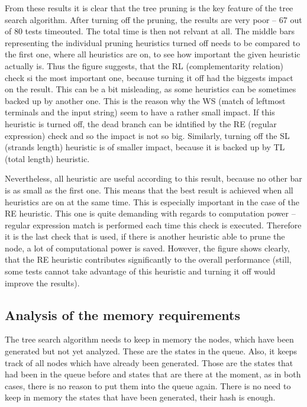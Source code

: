 From these results it is clear that the tree pruning is the key feature of the tree search algorithm. After turning off the pruning, the results are very poor -- 67 out of 80 tests timeouted. The total time is then not relvant at all. The middle bars representing the individual pruning heuristics turned off needs to be compared to the first one, where all heuristics are on, to see how important the given heuristic actually is. Thus the figure suggests, that the RL (complementarity relation) check si the most important one, because turning it off had the biggests impact on the result. This can be a bit misleading, as some heuristics can be sometimes backed up by another one. This is the reason why the WS (match of leftmost terminals and the input string) seem to have a rather small impact. If this heuristic is turned off, the dead branch can be idntified by the RE (regular expression) check and so the impact is not so big. Similarly, turning off the SL (strands length) heuristic is of smaller impact, because it is backed up by TL (total length) heuristic.

Nevertheless, all heuristic are useful according to this result, because no other bar is as small as the first one. This means that the best result is achieved when all heuristics are on at the same time. This is especially important in the case of the RE heuristic. This one is quite demanding with regards to computation power -- regular expression match is performed each time this check is executed. Therefore it is the last check that is used, if there is another heuristic able to prune the node, a lot of computational power is saved. However, the figure shows clearly, that the RE heuristic contributes significantly to the overall performance (still, some tests cannot take advantage of this heuristic and turning it off would improve the results).



\subsection{Analysis of the memory requirements}
The tree search algorithm needs to keep in memory the nodes, which have been generated but not yet analyzed. These are the states in the queue. Also, it keeps track of all nodes which have already been generated. Those are the states that had been in the queue before and states that are there at the moment, as in both cases, there is no reason to put them into the queue again. There is no need to keep in memory the states that have been generated, their hash is enough.

